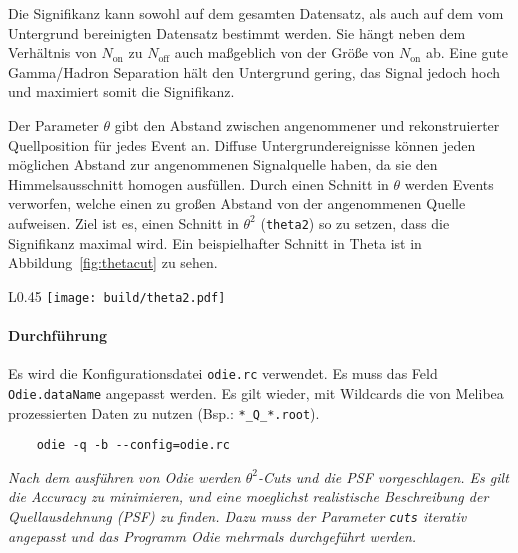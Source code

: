 Die Signifikanz kann sowohl auf dem gesamten Datensatz,
als auch auf dem vom Untergrund bereinigten Datensatz bestimmt werden. %
Sie hängt neben dem Verhältnis von $N_\text{on}$ zu $N_\text{off}$ auch
maßgeblich von der Größe von $N_\text{on}$ ab.
Eine gute Gamma/Hadron Separation hält den Untergrund gering,
das Signal jedoch hoch
und maximiert somit die Signifikanz.

Der Parameter $\theta$ gibt den Abstand zwischen
angenommener und rekonstruierter Quellposition
für jedes Event an.
Diffuse Untergrundereignisse können jeden möglichen Abstand zur
angenommenen Signalquelle haben,
da sie den Himmelsausschnitt homogen ausfüllen.
Durch einen Schnitt in $\theta$ werden Events verworfen,
welche einen zu großen Abstand von der angenommenen Quelle aufweisen.
Ziel ist es, einen Schnitt in $\theta^2$ (\texttt{theta2}) so zu setzen,
dass die Signifikanz maximal wird.
Ein beispielhafter Schnitt in Theta ist in
Abbildung~\ref{fig:thetacut} zu sehen.

\begin{wrapfigure}[12]{L}{0.45\textwidth}
		\centering
		\texttt{[image: build/theta2.pdf]}
		\caption{Theta2 Schnitt auf Daten zur Maximierung der Signifikanz.}%
		\label{fig:thetacut}
\end{wrapfigure}

\paragraph{Durchführung}%

Es wird die Konfigurationsdatei \texttt{odie.rc} verwendet.
Es muss das Feld \texttt{Odie.dataName} angepasst werden.
Es gilt wieder, mit Wildcards die von Melibea prozessierten Daten zu nutzen
(Bsp.: \texttt{*\_Q\_*.root}).

\begin{lstlisting}
	odie -q -b --config=odie.rc
\end{lstlisting}

\textit{Nach dem ausführen von Odie werden $\theta^2$-Cuts und die PSF vorgeschlagen.
Es gilt die Accuracy zu minimieren,
und eine moeglichst realistische Beschreibung der Quellausdehnung (PSF) zu finden.
Dazu muss der Parameter \texttt{cuts} iterativ angepasst und das Programm Odie
mehrmals durchgeführt werden.
}
